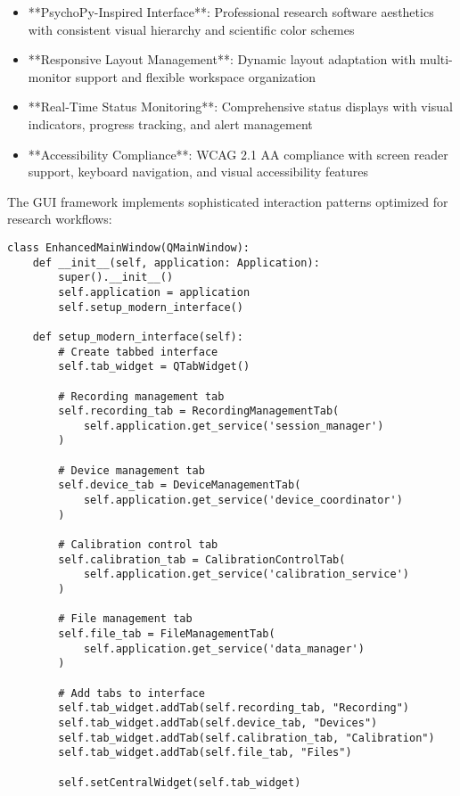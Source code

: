\documentclass[11pt,a4paper]{report}
\begin{document}
\begin{itemize}
\item **PsychoPy-Inspired Interface**: Professional research software aesthetics with consistent visual hierarchy and
  scientific color schemes
\item **Responsive Layout Management**: Dynamic layout adaptation with multi-monitor support and flexible workspace
  organization
\item **Real-Time Status Monitoring**: Comprehensive status displays with visual indicators, progress tracking, and alert
  management
\item **Accessibility Compliance**: WCAG 2.1 AA compliance with screen reader support, keyboard navigation, and visual
  accessibility features

\end{itemize}
The GUI framework implements sophisticated interaction patterns optimized for research workflows:

\begin{verbatim}
class EnhancedMainWindow(QMainWindow):
    def __init__(self, application: Application):
        super().__init__()
        self.application = application
        self.setup_modern_interface()

    def setup_modern_interface(self):
        # Create tabbed interface
        self.tab_widget = QTabWidget()

        # Recording management tab
        self.recording_tab = RecordingManagementTab(
            self.application.get_service('session_manager')
        )

        # Device management tab
        self.device_tab = DeviceManagementTab(
            self.application.get_service('device_coordinator')
        )

        # Calibration control tab
        self.calibration_tab = CalibrationControlTab(
            self.application.get_service('calibration_service')
        )

        # File management tab
        self.file_tab = FileManagementTab(
            self.application.get_service('data_manager')
        )

        # Add tabs to interface
        self.tab_widget.addTab(self.recording_tab, "Recording")
        self.tab_widget.addTab(self.device_tab, "Devices")
        self.tab_widget.addTab(self.calibration_tab, "Calibration")
        self.tab_widget.addTab(self.file_tab, "Files")

        self.setCentralWidget(self.tab_widget)
\end{verbatim}
\end{document}
